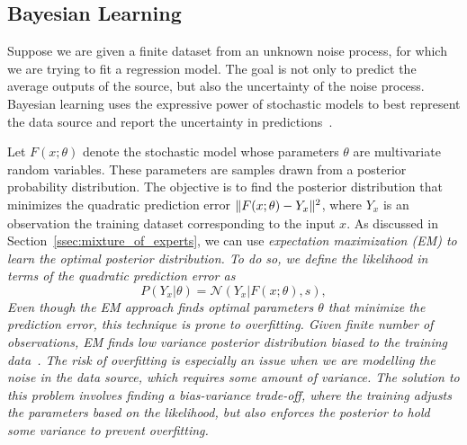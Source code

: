 \subsection{Bayesian Learning}
\label{ssec:bayesianLearning}

Suppose we are given a finite dataset from an unknown noise process, for which
we are trying to fit a regression model.
%
The goal is not only to predict the average outputs of the source, but also
the uncertainty of the noise process.
%
Bayesian learning uses the expressive power of stochastic models to best
represent the data source and report the uncertainty in
predictions~\cite{bishop2006pattern}.


Let $F(x; \theta)$ denote the stochastic model whose parameters $\theta$ are
multivariate random variables.
%
These parameters are samples drawn from a posterior probability distribution.
%
The objective is to find the posterior distribution that minimizes the quadratic
prediction error $\|{F(x; \theta) -  Y_x}\|_{{}_{}}^2$, where $Y_x$ is an observation
the training dataset corresponding to the input $x$.
%
As discussed in Section~\ref{ssec:mixture_of_experts}, we can use
\it{expectation maximization} \normalfont (EM) to learn the optimal posterior
distribution.
%
To do so, we define the likelihood in terms of the quadratic prediction error as
\begin{equation*}
  P(Y_x | \theta)  = \mathcal{N}(Y_x | F(x; \theta), s),
\end{equation*}
%
Even though the EM approach finds optimal parameters $\theta$ that
minimize the prediction error, this technique is prone to overfitting.
%
Given finite number of observations, EM finds low variance posterior
distribution \it{biased to the training
data}\normalfont~\cite{bishop2006pattern}. 
%
The risk of overfitting is especially an issue when we are modelling the noise
in the data source, which requires some amount of variance.
%
The solution to this problem involves finding a \it{bias-variance
trade-off}\normalfont, where the training adjusts the parameters based on the
likelihood, but also enforces the posterior to hold some variance to prevent
overfitting.
%
